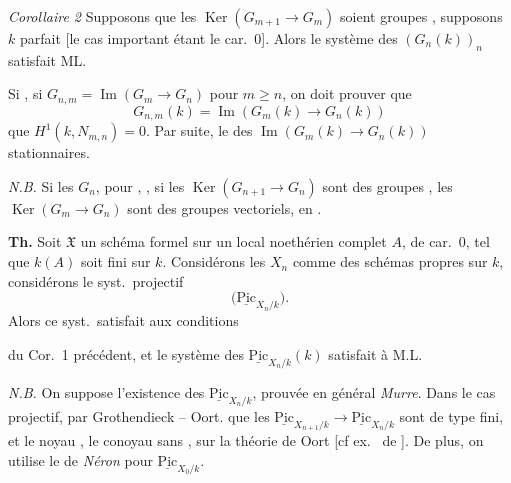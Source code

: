 \documentclass[11pt,a4paper]{article}
\begin{document}
\emph{Corollaire 2} Supposons que les
$\operatorname{Ker}(G_{m+1} \to G_m)$ soient \struck{\ill{}} \add{\ill{}}
 \struck{\ill{}} groupes ,
 supposons $k$ parfait
[le cas important étant le car.~$0$]. Alors le système des
$(G_n(k))_n$ satisfait ML.


 Si \ill{}, si $G_{n,m} = \operatorname{Im}(G_m \to G_n)$ pour
$m \geqslant n$, on doit prouver que
\[
G_{n,m}(k) = \operatorname{Im}(G_m(k) \to G_n(k))
\]
  que $H^1(k, N_{m,n}) = 0$. Par
suite, \add{\ill{} \ill{},} le  des
$\operatorname{Im}(G_m(k) \to G_n(k))$  stationnaires.

\emph{N.B.} Si les $G_n$, \ill{} pour , \ill{} \ill{}
,  si les
$\operatorname{Ker}(G_{n+1} \to G_n)$ sont des groupes
, \struck{\ill{} \ill{}} les
$\operatorname{Ker}(G_m \to G_n)$  \ill{} sont des groupes
vectoriels, en  \ill{} \ill{}.
\marginal{\ill{}}

\textbf{Th.} Soit $\mathfrak{X}$ un schéma formel  sur un
\ill{} local noethérien complet $A$,   de car.~$0$, tel que $k(A)$ soit fini sur $k$. Considérons les $X_n$
comme des schémas propres sur $k$, considérons le syst.\ projectif
\[
\bigl(\underline{\mathrm{Pic}}_{X_n/k}\bigr) .
\]
Alors ce syst.\ satisfait aux conditions

du Cor.~1 précédent, et le système des
$\underline{\mathrm{Pic}}_{X_n/k}(k)$ satisfait à M.L.


\emph{N.B.} On suppose l'existence des $\underline{\mathrm{Pic}}_{X_n/k}$,
\ill{} prouvée en général  \emph{Murre}. Dans le cas
projectif,  \ill{} \ill{} par Grothendieck -- Oort.
 que les
$\underline{\mathrm{Pic}}_{X_{n+1}/k} \to \underline{\mathrm{Pic}}_{X_n/k}$
sont de type fini, et \struck{\ill{}} le noyau \struck{\ill{}}
 
\struck{\ill{}}, le conoyau sans 
,  sur la théorie de Oort
 [cf \ill{} ex.\ \ill{} de ].
De plus, on utilise le  \ill{} de
\emph{Néron} \struck{\ill{}} pour $\underline{\mathrm{Pic}}_{X_0/k}$.
\end{document}
